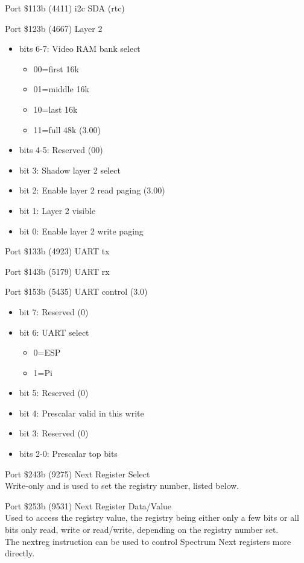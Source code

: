 Port \$113b (4411) i2c SDA (rtc)

Port \$123b (4667) Layer 2
\begin{itemize}
\item[] bits 6-7: Video RAM bank select
  \begin{itemize}
  \item[] 00=first 16k
  \item[] 01=middle 16k
  \item[] 10=last 16k
  \item[] 11=full 48k (3.00)
  \end{itemize}
\item[] bits 4-5: Reserved (00)
\item[] bit 3: Shadow layer 2 select
\item[] bit 2: Enable layer 2 read paging (3.00)
\item[] bit 1: Layer 2 visible
\item[] bit 0: Enable layer 2 write paging
\end{itemize}

Port \$133b (4923) UART tx

Port \$143b (5179) UART rx

Port \$153b (5435) UART control (3.0)
\begin{itemize}
\item[] bit 7: Reserved (0)
\item[] bit 6: UART select
  \begin{itemize}
  \item[] 0=ESP
  \item[] 1=Pi
  \end{itemize}
\item[] bit 5: Reserved (0)
\item[] bit 4: Prescalar valid in this write
\item[] bit 3: Reserved (0)
\item[] bits 2-0: Prescalar top bits
\end{itemize}

Port \$243b (9275) Next Register Select\\
Write-only and is used to set the registry number, listed below.

Port \$253b (9531) Next Register Data/Value\\
Used to access the registry value, the registry being either only a
few bits or all bits only read, write or read/write, depending on the
registry number set.\\
The nextreg instruction can be used to control Spectrum Next registers
more directly.

